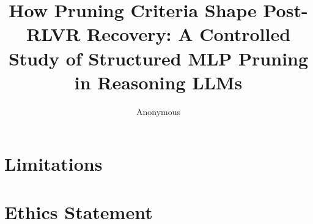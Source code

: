 \documentclass[11pt]{article}
\title{How Pruning Criteria Shape Post-RLVR Recovery: A Controlled Study of Structured MLP Pruning in Reasoning LLMs}
\author{Anonymous}
\begin{document}
\maketitle

\begin{abstract}

\end{abstract}







\section*{Limitations}


\section*{Ethics Statement}




\appendix

\end{document}
